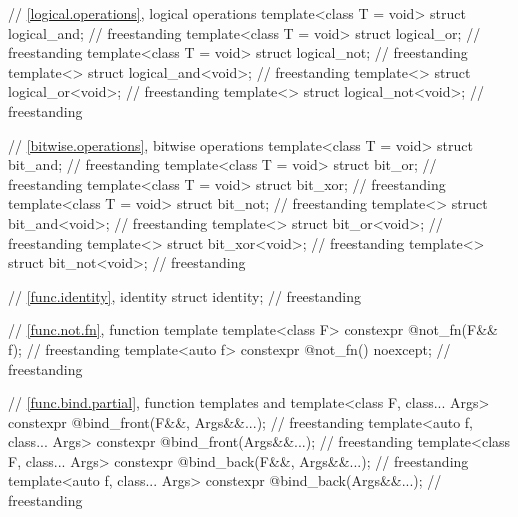 \begin{codeblock}
{  // \ref{logical.operations}, logical operations
  template<class T = void> struct logical_and;                                      // freestanding
  template<class T = void> struct logical_or;                                       // freestanding
  template<class T = void> struct logical_not;                                      // freestanding
  template<> struct logical_and<void>;                                              // freestanding
  template<> struct logical_or<void>;                                               // freestanding
  template<> struct logical_not<void>;                                              // freestanding

  // \ref{bitwise.operations}, bitwise operations
  template<class T = void> struct bit_and;                                          // freestanding
  template<class T = void> struct bit_or;                                           // freestanding
  template<class T = void> struct bit_xor;                                          // freestanding
  template<class T = void> struct bit_not;                                          // freestanding
  template<> struct bit_and<void>;                                                  // freestanding
  template<> struct bit_or<void>;                                                   // freestanding
  template<> struct bit_xor<void>;                                                  // freestanding
  template<> struct bit_not<void>;                                                  // freestanding

  // \ref{func.identity}, identity
  struct identity;                                                                  // freestanding

  // \ref{func.not.fn}, function template 
  template<class F> constexpr @\unspec@ not_fn(F&& f);                            // freestanding
  template<auto f> constexpr @\unspec@ not_fn() noexcept;                         // freestanding

  // \ref{func.bind.partial}, function templates  and 
  template<class F, class... Args>
    constexpr @\unspec@ bind_front(F&&, Args&&...);                               // freestanding
  template<auto f, class... Args>
    constexpr @\unspec@ bind_front(Args&&...);                                    // freestanding
  template<class F, class... Args>
    constexpr @\unspec@ bind_back(F&&, Args&&...);                                // freestanding
  template<auto f, class... Args>
    constexpr @\unspec@ bind_back(Args&&...);                                     // freestanding

}
\end{codeblock}
